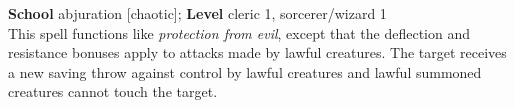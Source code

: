 \textbf{School} abjuration [chaotic]; \textbf{Level} cleric 1, sorcerer/wizard 1\\
This spell functions like \textit{protection from evil}, except that the deflection and resistance bonuses apply to attacks made by lawful creatures. The target receives a new saving throw against control by lawful creatures and lawful summoned creatures cannot touch the target.\\
